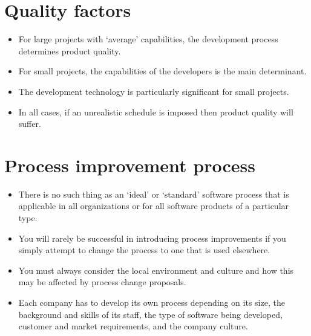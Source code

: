 \section{Quality factors}
\begin{itemize}



\item For large projects with ‘average’ capabilities, the development process determines product quality.

\item For small projects, the capabilities of the developers is the main determinant.

\item The development technology is particularly significant for small projects.

\item In all cases, if an unrealistic schedule is imposed then product quality will suffer.


\end{itemize}

\section{Process improvement process}
\begin{itemize}

\item There is no such thing as an ‘ideal’ or ‘standard’ software process that is applicable in all organizations or for all software products of a particular type.

   \item You will rarely be successful in introducing process improvements if you simply attempt to change the process to one that is used elsewhere.
   \item You must always consider the local environment and culture and how this may be affected by process change proposals.

\item Each company has to develop its own process depending on its size, the background and skills of its staff, the type of software being developed, customer and market requirements, and the company culture.

\end{itemize}


